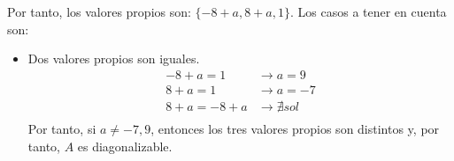 \begin{ejercicio}
    Por tanto, los valores propios son: $\{-8+a, 8+a, 1\}$. Los casos a tener en cuenta son:
    \begin{itemize}
       \item Dos valores propios son iguales.
       \begin{equation*} \begin{array}{ll}
           -8+a=1 & \longrightarrow a=9 \\
           8+a=1 & \longrightarrow a=-7 \\
           8+a=-8+a & \longrightarrow \nexists sol \\
       \end{array}\end{equation*}
       Por tanto, si $a\neq-7,9$, entonces los tres valores propios son distintos y, por tanto, $A$ es diagonalizable.


\end{itemize}
\end{ejercicio}
